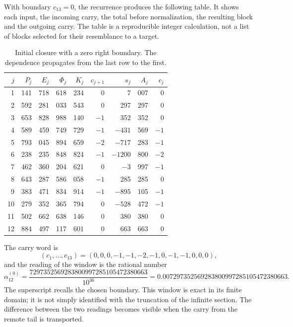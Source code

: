 With boundary \(c_{13}=0\), the recurrence produces the following table.
It shows each input, the incoming carry, the total before normalization,
the resulting block and the outgoing carry. The table is a reproducible integer
calculation, not a list of blocks selected for their resemblance to
a target.

\begin{table}[htbp]
\centering
\small
\setlength{\tabcolsep}{3.5pt}
\begin{tabular}{r|rrrr|rr|rr}
\hline
\(j\)&\(P_j\)&\(E_j\)&\(\Phi_j\)&\(K_j\)&\(c_{j+1}\)&\(s_j\)&\(A_j\)&\(c_j\)\\
\hline
1&141&718&618&234&0&7&007&0\\
2&592&281&033&543&0&297&297&0\\
3&653&828&988&140&\(-1\)&352&352&0\\
4&589&459&749&729&\(-1\)&\(-431\)&569&\(-1\)\\
5&793&045&894&659&\(-2\)&\(-717\)&283&\(-1\)\\
6&238&235&848&824&\(-1\)&\(-1200\)&800&\(-2\)\\
7&462&360&204&621&0&\(-3\)&997&\(-1\)\\
8&643&287&586&058&\(-1\)&285&285&0\\
9&383&471&834&914&\(-1\)&\(-895\)&105&\(-1\)\\
10&279&352&365&794&0&\(-528\)&472&\(-1\)\\
11&502&662&638&146&0&380&380&0\\
12&884&497&117&601&0&663&663&0\\
\hline
\end{tabular}
\caption{Initial closure with a zero right boundary. The dependence propagates from the last row to the first.}
\label{tab:alpha-ventana}
\end{table}

The carry word is
\[
 (c_1,\ldots,c_{13})=(0,0,0,-1,-1,-2,-1,0,-1,-1,0,0,0),
\]
and the reading of the window is the rational number
\begin{equation}
 \alpha_{12}^{(0)}
 =\frac{7297352569283800997285105472380663}{10^{36}}
 =0.007297352569283800997285105472380663.
 \label{eq:alpha-ventana-cero}
\end{equation}
The superscript recalls the chosen boundary. This window is exact in its
finite domain; it is not simply identified with the truncation of the
infinite section. The difference between the two readings becomes visible when
the carry from the remote tail is transported.

